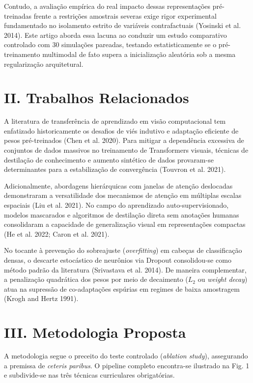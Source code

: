 \documentclass[conference,10pt]{IEEEtran}
\begin{document}
Contudo, a avaliação empírica do real impacto dessas representações
pré-treinadas frente a restrições amostrais severas exige rigor
experimental fundamentado no isolamento estrito de variáveis
contrafactuais (Yosinski et al. 2014). Este artigo aborda essa lacuna ao
conduzir um estudo comparativo controlado com 30 simulações pareadas,
testando estatisticamente se o pré-treinamento multimodal de fato supera
a inicialização aleatória sob a mesma regularização arquitetural.

\section{II. Trabalhos Relacionados}\label{ii.-trabalhos-relacionados}

A literatura de transferência de aprendizado em visão computacional tem
enfatizado historicamente os desafios de viés indutivo e adaptação
eficiente de pesos pré-treinados (Chen et al. 2020). Para mitigar a
dependência excessiva de conjuntos de dados massivos no treinamento de
Transformers visuais, técnicas de destilação de conhecimento e aumento
sintético de dados provaram-se determinantes para a estabilização de
convergência (Touvron et al. 2021).

Adicionalmente, abordagens hierárquicas com janelas de atenção
deslocadas demonstraram a versatilidade dos mecanismos de atenção em
múltiplas escalas espaciais (Liu et al. 2021). No campo do aprendizado
auto-supervisionado, modelos mascarados e algoritmos de destilação
direta sem anotações humanas consolidaram a capacidade de generalização
visual em representações compactas (He et al. 2022; Caron et al. 2021).

No tocante à prevenção do sobreajuste (\emph{overfitting}) em cabeças de
classificação densas, o descarte estocástico de neurônios via Dropout
consolidou-se como método padrão da literatura (Srivastava et al. 2014).
De maneira complementar, a penalização quadrática dos pesos por meio de
decaimento (\(L_2\) ou \emph{weight decay}) atua na supressão de
co-adaptações espúrias em regimes de baixa amostragem (Krogh and Hertz
1991).

\section{III. Metodologia Proposta}\label{iii.-metodologia-proposta}

A metodologia segue o preceito do teste controlado (\emph{ablation
study}), assegurando a premissa de \emph{ceteris paribus}. O pipeline
completo encontra-se ilustrado na Fig. 1 e subdivide-se nas três
técnicas curriculares obrigatórias.
\end{document}
